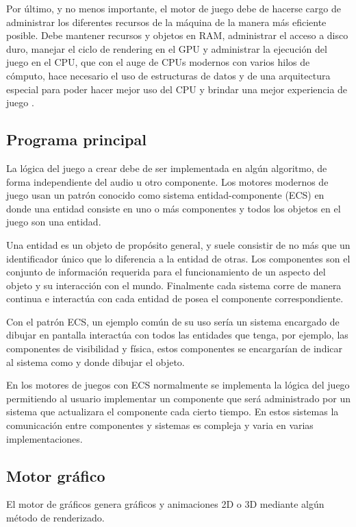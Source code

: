 Por último, y no menos importante, el motor de juego debe de hacerse cargo de administrar los diferentes recursos de la máquina de la manera más eficiente posible. Debe mantener recursos y objetos en RAM, administrar el acceso a disco duro, manejar el ciclo de rendering en el GPU y administrar la ejecución del juego en el CPU, que con el auge de CPUs modernos con varios hilos de cómputo, hace necesario el uso de estructuras de datos y de una arquitectura especial para poder hacer mejor uso del CPU y brindar una mejor experiencia de juego \cite{andrews2009designing}.

\subsection{Programa principal} \label{sec:MTlogica}

La lógica del juego a crear debe de ser implementada en algún algoritmo, de forma independiente del audio u otro componente. Los motores modernos de juego usan un patrón conocido como sistema entidad-componente (ECS) en donde una entidad consiste en uno o más componentes y todos los objetos en el juego son una entidad.

Una entidad es un objeto de propósito general, y suele consistir de no más que un identificador único que lo diferencia a la entidad de otras. Los componentes son el conjunto de información requerida para el funcionamiento de un aspecto del objeto y su interacción con el mundo. Finalmente cada sistema corre de manera continua e interactúa con cada entidad de posea el componente correspondiente.

Con el patrón ECS, un ejemplo común de su uso sería un sistema encargado de dibujar en pantalla interactúa con todos las entidades que tenga, por ejemplo, las componentes de visibilidad y física, estos componentes se encargarían de indicar al sistema como y donde dibujar el objeto.

En los motores de juegos con ECS normalmente se implementa la lógica del juego permitiendo al usuario implementar un componente que será administrado por un sistema que actualizara el componente cada cierto tiempo. En estos sistemas la comunicación entre componentes y sistemas es compleja y varia en varias implementaciones.

\subsection{Motor gráfico}

El motor de gráficos genera gráficos y animaciones 2D o 3D mediante algún método de renderizado.

